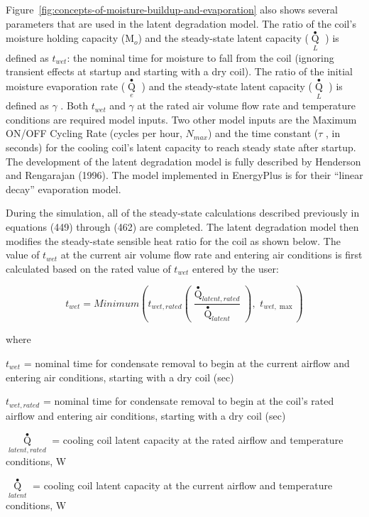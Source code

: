 Figure~\ref{fig:concepts-of-moisture-buildup-and-evaporation} also shows several parameters that are used in the latent degradation model. The ratio of the coil's moisture holding capacity (M\(_{o}\)) and the steady-state latent capacity (\({\mathop Q\limits^ \bullet_L}\) ) is defined as \(t_{wet}\): the nominal time for moisture to fall from the coil (ignoring transient effects at startup and starting with a dry coil). The ratio of the initial moisture evaporation rate (\({\mathop Q\limits^ \bullet_e}\) ) and the steady-state latent capacity (\({\mathop Q\limits^ \bullet_L}\) ) is defined as \(\gamma\) . Both \(t_{wet}\) and \(\gamma\) at the rated air volume flow rate and temperature conditions are required model inputs. Two other model inputs are the Maximum ON/OFF Cycling Rate (cycles per hour, \(N_{max}\)) and the time constant (\(\tau\) , in seconds) for the cooling coil's latent capacity to reach steady state after startup. The development of the latent degradation model is fully described by Henderson and Rengarajan (1996). The model implemented in EnergyPlus is for their ``linear decay'' evaporation model.

During the simulation, all of the steady-state calculations described previously in equations (449) through (462) are completed. The latent degradation model then modifies the steady-state sensible heat ratio for the coil as shown below. The value of \(t_{wet}\) at the current air volume flow rate and entering air conditions is first calculated based on the rated value of \(t_{wet}\) entered by the user:

\begin{equation}
{t_{wet}} = Minimum\left( {{t_{wet,rated}}\left( {\frac{{{{\mathop Q\limits^ \bullet  }_{latent,rated}}}}{{{{\mathop Q\limits^ \bullet  }_{latent}}}}} \right),\,\,{t_{wet,\max }}} \right)
\end{equation}

where

\(t_{wet}\) = nominal time for condensate removal to begin at the current airflow and entering air conditions, starting with a dry coil (sec)

\(t_{wet,rated}\) = nominal time for condensate removal to begin at the coil's rated airflow and entering air conditions, starting with a dry coil (sec)

\({\mathop Q\limits^ \bullet_{latent,rated}}\) = cooling coil latent capacity at the rated airflow and temperature conditions, W

\({\mathop Q\limits^ \bullet_{latent}}\) = cooling coil latent capacity at the current airflow and temperature conditions, W

